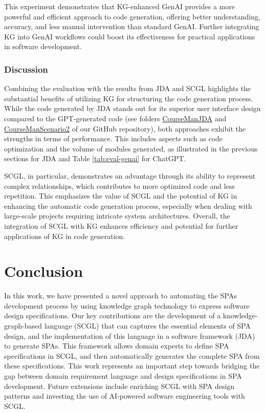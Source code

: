 \documentclass[runningheads]{llncs}
\begin{document}
This experiment demonstrates that KG-enhanced GenAI provides a more powerful and efficient approach to code generation, offering better understanding, accuracy, and less manual intervention than standard GenAI. Further integrating KG into GenAI workflows could boost its effectiveness for practical applications in software development.

\subsubsection{Discussion}

Combining the evaluation with the results from JDA and SCGL highlights the substantial benefits of utilizing KG for structuring the code generation process. While the code generated by JDA stands out for its superior user interface design compared to the GPT-generated code (see folders \href{https://github.com/jdomainapp/doc-scgl-soict2024/tree/main/CourseManJDA}{CourseManJDA} and \href{https://github.com/jdomainapp/doc-scgl-soict2024/tree/main/CourseManScenario2}{CourseManScenario2} of our GitHub repository), both approaches exhibit the strengths in terms of performance. This includes aspects such as code optimization and the volume of modules generated, as illustrated in the previous sections for JDA and Table \ref{tab:eval-genai} for ChatGPT.

SCGL, in particular, demonstrates an advantage through its ability to represent complex relationships, which contributes to more optimized code and less repetition. This emphasizes the value of SCGL and the potential of KG in enhancing the automatic code generation process, especially when dealing with large-scale projects requiring intricate system architectures. Overall, the integration of SCGL with KG enhances efficiency and potential for further applications of KG in code generation.

\section{Conclusion} \label{section6}
In this work, we have presented a novel approach to automating the SPAs development process by using knowledge graph technology to express software design specifications. Our key contributions are the development of a knowledge-graph-based language (SCGL) that can captures the essential elements of SPA design, and the implementation of this language in a software framework (JDA) to generate SPAs. This framework allows domain experts to define SPA specifications in SCGL, and then automatically generates the complete SPA from these specifications. This work represents an important step towards bridging the gap between domain requirement language and design specifications in SPA development. Future extensions include enriching SCGL with SPA design patterns and investing the use of AI-powered software engineering tools with SCGL.



\end{document}
